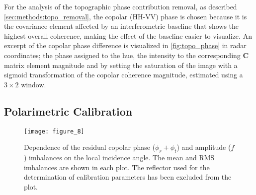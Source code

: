For the analysis of the topographic phase contribution removal, as described \autoref{sec:methods:topo_removal}, the copolar (HH-VV) phase is chosen because it is the covariance element affected by an interferometric baseline that shows the highest overall coherence, making the effect of the baseline easier to visualize. An excerpt of the copolar phase difference is visualized in  \autoref{fig:topo_phase} in radar coordinates; the phase assigned to the hue, the intensity to the corresponding $\mathbf{C}$ matrix element magnitude and by setting the saturation of the image with a sigmoid transformation of the copolar coherence magnitude, estimated using a $\mathrm{3 \times 2}$ window.\\ 

\subsection{Polarimetric Calibration}\label{sec:results:proc_polcal}

\begin{figure}[Ht!]
	\centering
	\texttt{[image: figure\_8]}
	\caption{Dependence of the residual copolar phase ($\phi_r + \phi_t$) and amplitude  ($f$) imbalances on the local incidence angle. The mean and RMS imbalances are shown in each plot. The reflector used for the determination of calibration parameters has been excluded from the plot.}
	\label{fig:inc_angle_trend}
\end{figure}
				
